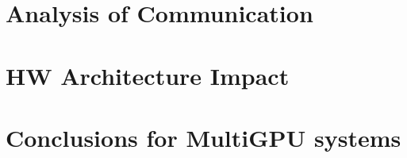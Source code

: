 \section{Analysis of Communication}
\section{HW Architecture Impact}
\section{Conclusions for MultiGPU systems}
